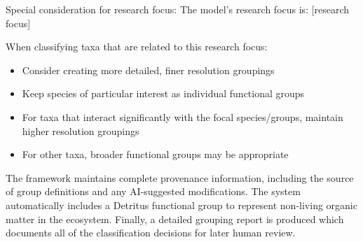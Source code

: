 \begin{prompt}
Special consideration for research focus:
The model's research focus is: [research focus]

When classifying taxa that are related to this research focus:
\begin{itemize}
\item Consider creating more detailed, finer resolution groupings
\item Keep species of particular interest as individual functional groups
\item For taxa that interact significantly with the focal species/groups, maintain higher resolution groupings
\item For other taxa, broader functional groups may be appropriate
\end{itemize}
\end{prompt}

The framework maintains complete provenance information, including the source of group definitions and any AI-suggested modifications. The system automatically includes a Detritus functional group to represent non-living organic matter in the ecosystem. Finally, a detailed grouping report is produced which documents all of the classification decisions for later human review.
